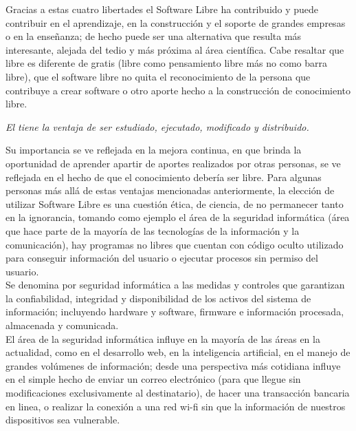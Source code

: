 \begin{multicols}{2}
\vspace{0.15cm}

Gracias a estas cuatro libertades el Software Libre ha contribuido y puede contribuir en el aprendizaje, en la construcción y el soporte de grandes empresas o en la enseñanza; de hecho puede ser una alternativa que resulta más interesante, alejada del tedio y más próxima al área científica. Cabe resaltar que libre es diferente de gratis (libre como pensamiento libre más no como barra libre), que el software libre no quita el reconocimiento de la persona que contribuye a crear software o otro aporte hecho a la construcción de conocimiento libre.

\vspace{0.3cm}

\begin{entradilla}
{\em El {\color{introcolor}{Software Libre}} tiene la ventaja de ser estudiado, ejecutado, modificado y distribuido.}
\end{entradilla}

\vspace{0.3cm}

Su importancia se ve reflejada en la mejora continua, en que brinda la oportunidad de aprender apartir de aportes realizados por otras personas, se ve reflejada en el hecho de que el conocimiento debería ser libre. Para algunas personas más allá de estas ventajas mencionadas anteriormente, la elección de utilizar Software Libre es una cuestión ética, de ciencia, de no permanecer tanto en la ignorancia, tomando como ejemplo el área de la seguridad informática (área que hace parte de la mayoría de las tecnologías de la información y la comunicación), hay programas no libres que cuentan con código oculto utilizado para conseguir información del usuario o ejecutar procesos sin permiso del usuario.\\

Se denomina por seguridad informática a las medidas y controles que garantizan la confiabilidad, integridad y disponibilidad de los activos del sistema de información; incluyendo hardware y software, firmware e información procesada, almacenada y comunicada. \\

El área de la seguridad informática influye en la mayoría de las áreas en la actualidad, como en el desarrollo web, en la inteligencia artificial, en el manejo de grandes volúmenes de información; desde una perspectiva más cotidiana influye en el simple hecho de enviar un correo electrónico (para que llegue sin modificaciones exclusivamente al destinatario), de hacer una transacción bancaria en linea, o realizar la conexión a una red wi-fi sin que la información de nuestros dispositivos sea vulnerable.


\end{multicols}
